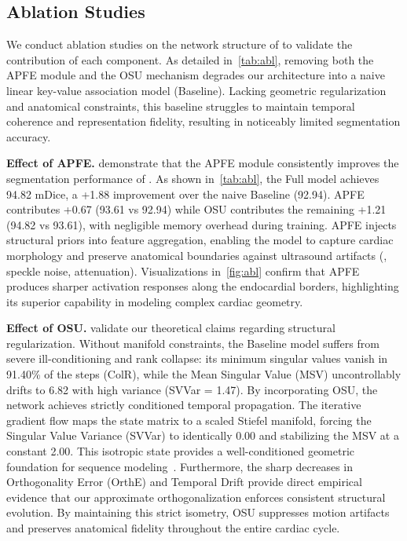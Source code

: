 \subsection{Ablation Studies}
\label{subsec:abl}

\noindent
We conduct ablation studies on the network structure of \mymodel to validate the contribution of each component.
As detailed in~\cref{tab:abl}, removing both the APFE module and the OSU mechanism degrades our architecture into a naive linear key-value association model (Baseline).
Lacking geometric regularization and anatomical constraints, this baseline struggles to maintain temporal coherence and representation fidelity, resulting in noticeably limited segmentation accuracy.

\noindent
\textbf{Effect of APFE.}
 demonstrate that the APFE module consistently improves the segmentation performance of \mymodel.
As shown in~\cref{tab:abl}, the Full model achieves 94.82 mDice, a +1.88 improvement over the naive Baseline (92.94).
APFE contributes +0.67 (93.61 vs 92.94) while OSU contributes the remaining +1.21 (94.82 vs 93.61), with negligible memory overhead during training.
APFE injects structural priors into feature aggregation, enabling the model to capture cardiac morphology and preserve anatomical boundaries against ultrasound artifacts (\eg, speckle noise, attenuation).
Visualizations in~\cref{fig:abl} confirm that APFE produces sharper activation responses along the endocardial borders, highlighting its superior capability in modeling complex cardiac geometry.



\noindent
\textbf{Effect of OSU.}
 validate our theoretical claims regarding structural regularization.
Without manifold constraints, the Baseline model suffers from severe ill-conditioning and rank collapse: its minimum singular values vanish in 91.40\% of the steps (ColR), while the Mean Singular Value (MSV) uncontrollably drifts to 6.82 with high variance (SVVar = 1.47).
By incorporating OSU, the network achieves strictly conditioned temporal propagation.
The iterative gradient flow maps the state matrix to a scaled Stiefel manifold, forcing the Singular Value Variance (SVVar) to identically 0.00 and stabilizing the MSV at a constant 2.00.
This isotropic state provides a well-conditioned geometric foundation for sequence modeling~\cite{ICML16_urnn}.
Furthermore, the sharp decreases in Orthogonality Error (OrthE) and Temporal Drift provide direct empirical evidence that our approximate orthogonalization enforces consistent structural evolution.
By maintaining this strict isometry, OSU suppresses motion artifacts and preserves anatomical fidelity throughout the entire cardiac cycle.

